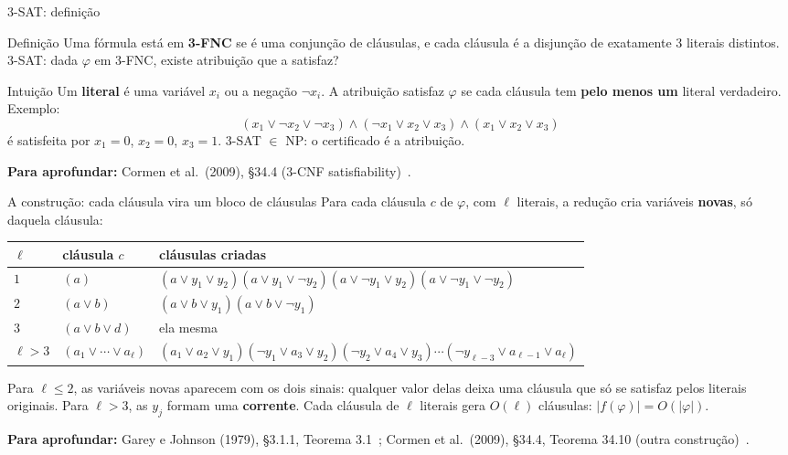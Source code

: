 \documentclass[aspectratio=169,xcolor=table]{beamer}
\newcommand{\fonte}[1]{%
  \vfill
  {\tiny\color{gray!55!black}\textbf{Para aprofundar:} #1\par}%
}
\newcommand{\prob}[1]{\textsc{#1}}
\newcommand{\nao}{\lnot}
\begin{document}
\begin{frame}{\prob{3-SAT}: definição}
  \begin{block}{Definição}
    \small
    Uma fórmula está em \textbf{3-FNC} se é uma conjunção de cláusulas, e cada cláusula é
    a disjunção de exatamente $3$ literais distintos. \prob{3-SAT}: dada $\varphi$ em
    3-FNC, existe atribuição que a satisfaz?
  \end{block}
  \begin{exampleblock}{Intuição}
    \scriptsize
    Um \textbf{literal} é uma variável $x_i$ ou a negação $\nao x_i$. A atribuição satisfaz
    $\varphi$ se cada cláusula tem \textbf{pelo menos um} literal verdadeiro. Exemplo:
    \[
      (x_1 \lor \nao x_2 \lor \nao x_3) \land (\nao x_1 \lor x_2 \lor x_3) \land
      (x_1 \lor x_2 \lor x_3)
    \]
    é satisfeita por $x_1 = 0$, $x_2 = 0$, $x_3 = 1$. \prob{3-SAT} $\in$ NP: o certificado
    é a atribuição.
  \end{exampleblock}
  \fonte{Cormen et al.\ (2009), \S 34.4 (3-CNF satisfiability)~\cite{cormen2009introduction}.}
\end{frame}

\begin{frame}{A construção: cada cláusula vira um bloco de cláusulas}
  \scriptsize
  Para cada cláusula $c$ de $\varphi$, com $\ell$ literais, a redução cria variáveis
  \textbf{novas}, só daquela cláusula:
  \smallskip

  \centering
  \begin{tabular}{lll}
    \toprule
    $\ell$ & cláusula $c$ & cláusulas criadas \\
    \midrule
    $1$ & $(a)$ & $(a \lor y_1 \lor y_2)(a \lor y_1 \lor \nao y_2)(a \lor \nao y_1 \lor y_2)
                   (a \lor \nao y_1 \lor \nao y_2)$ \\
    $2$ & $(a \lor b)$ & $(a \lor b \lor y_1)(a \lor b \lor \nao y_1)$ \\
    $3$ & $(a \lor b \lor d)$ & ela mesma \\
    $\ell > 3$ & $(a_1 \lor \cdots \lor a_\ell)$ &
      $(a_1 \lor a_2 \lor y_1)(\nao y_1 \lor a_3 \lor y_2)(\nao y_2 \lor a_4 \lor y_3)
      \cdots(\nao y_{\ell-3} \lor a_{\ell-1} \lor a_\ell)$ \\
    \bottomrule
  \end{tabular}
  \medskip

  \raggedright
  Para $\ell \le 2$, as variáveis novas aparecem com os dois sinais: qualquer valor delas
  deixa uma cláusula que só se satisfaz pelos literais originais. Para $\ell > 3$, as $y_j$
  formam uma \textbf{corrente}. Cada cláusula de $\ell$ literais gera $O(\ell)$ cláusulas:
  $|f(\varphi)| = O(|\varphi|)$.
  \fonte{Garey e Johnson (1979), \S 3.1.1, Teorema 3.1~\cite{garey1979computers};
    Cormen et al.\ (2009), \S 34.4, Teorema 34.10 (outra construção)~\cite{cormen2009introduction}.}
\end{frame}
\end{document}
